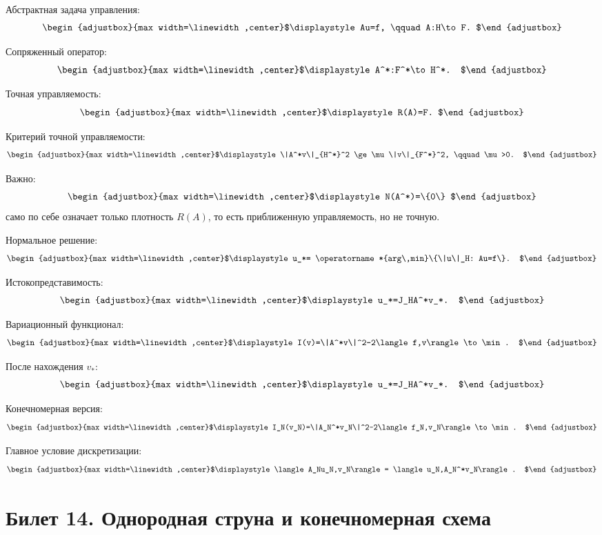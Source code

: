 \documentclass[a4paper]{article}
\newenvironment{fitdisplay}{%
  \[\begin{adjustbox}{max width=\linewidth,center}$\displaystyle
}{%
  $\end{adjustbox}\]
}
\begin{document}
\begin{multicols}{3}
Абстрактная задача управления:
\begin{fitdisplay}
 Au=f,
 \qquad
 A:H\to F.
\end{fitdisplay}

Сопряженный оператор:
\begin{fitdisplay}
 A^*:F^*\to H^*.
\end{fitdisplay}

Точная управляемость:
\begin{fitdisplay}
 R(A)=F.
\end{fitdisplay}

Критерий точной управляемости:
\begin{fitdisplay}
 \|A^*v\|_{H^*}^2
 \ge
 \mu\|v\|_{F^*}^2,
 \qquad \mu>0.
\end{fitdisplay}

Важно:
\begin{fitdisplay}
 N(A^*)=\{0\}
\end{fitdisplay}
само по себе означает только плотность $R(A)$, то есть приближенную управляемость, но не точную.

Нормальное решение:
\begin{fitdisplay}
 u_*=
 \operatorname*{arg\,min}\{\|u\|_H: Au=f\}.
\end{fitdisplay}

Истокопредставимость:
\begin{fitdisplay}
 u_*=J_HA^*v_*.
\end{fitdisplay}

Вариационный функционал:
\begin{fitdisplay}
 I(v)=\|A^*v\|^2-2\langle f,v\rangle\to\min.
\end{fitdisplay}

После нахождения $v_*$:
\begin{fitdisplay}
 u_*=J_HA^*v_*.
\end{fitdisplay}

Конечномерная версия:
\begin{fitdisplay}
 I_N(v_N)=\|A_N^*v_N\|^2-2\langle f_N,v_N\rangle\to\min.
\end{fitdisplay}

Главное условие дискретизации:
\begin{fitdisplay}
 \langle A_Nu_N,v_N\rangle
 =
 \langle u_N,A_N^*v_N\rangle.
\end{fitdisplay}

\section*{Билет 14. Однородная струна и конечномерная схема}


\end{multicols}
\end{document}
